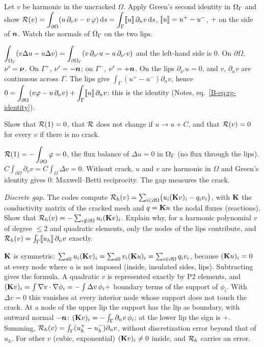 \q Let $v$ be harmonic in the uncracked $\Omega$. Apply Green's second
identity in $\Omega_\Gamma$ and show
$\displaystyle \mathcal{R}(v)=\int_{\partial\Omega}(u\,\partial_\nu v-v\,\varphi)\,\mathrm{d} s
=\int_\Gamma[\![u]\!]\,\partial_nv\,\mathrm{d} s$, $[\![u]\!]=u^+-u^-$, $+$ on the side
of $\bm{n}$. Watch the normals of $\Omega_\Gamma$ on the two lips.
\begin{answer}
$\displaystyle \int_{\Omega_\Gamma}(v\Delta u-u\Delta v)=\int_{\partial\Omega_\Gamma}(v\,\partial_{\nu'}u
-u\,\partial_{\nu'}v)$ and the left-hand side is $0$. On $\partial\Omega$,
$\nu'=\bm{\nu}$. On $\Gamma^+$, $\nu'=-\bm{n}$; on $\Gamma^-$, $\nu'=+\bm{n}$. On the
lips $\partial_{\nu'}u=0$, and $v$, $\partial_nv$ are continuous across
$\Gamma$. The lips give $\displaystyle \int_\Gamma(u^+-u^-)\partial_nv$, hence
$\displaystyle 0=\int_{\partial\Omega}(v\varphi-u\,\partial_\nu v)+\int_\Gamma[\![u]\!]\,\partial_nv$: this is the identity (Notes, eq.~\eqref{B-eq:rg-identity}).
\end{answer}

\q Show that $\mathcal{R}(1)=0$, that $\mathcal{R}$ does not change if $u\to u+C$, and that
$\mathcal{R}(v)=0$ for every $v$ if there is no crack.
\begin{answer}
$\displaystyle \mathcal{R}(1)=-\int_{\partial\Omega}\varphi=0$, the flux balance of
$\Delta u=0$ in $\Omega_\Gamma$ (no flux through the lips).
$\displaystyle C\int_{\partial\Omega}\partial_\nu v=C\int_\Omega\Delta v=0$.
Without crack, $u$ and $v$ are harmonic in $\Omega$ and Green's identity
gives $0$: Maxwell--Betti reciprocity. The gap measures the crack.
\end{answer}

\q \emph{Discrete gap.} The codes compute
$\mathcal{R}_h(v)=\sum_{i\in\partial\Omega}\bigl(u_i(\mathbf{K}v)_i-q_iv_i\bigr)$, with
$\mathbf{K}$ the conductivity matrix of the cracked mesh and $q=\mathbf{K}u$ the
nodal fluxes (reactions). Show that $\mathcal{R}_h(v)=-\sum_{i\notin\partial\Omega}
u_i(\mathbf{K}v)_i$. Explain why, for a harmonic polynomial $v$ of degree $\le2$
and quadratic elements, only the nodes of the lips contribute, and
$\mathcal{R}_h(v)=\int_\Gamma[\![u_h]\!]\,\partial_nv$ exactly.
\begin{answer}
$\mathbf{K}$ is symmetric:
$\sum_{\rm all}u_i(\mathbf{K}v)_i=\sum_{\rm all}v_i(\mathbf{K}u)_i=\sum_{i\in
\partial\Omega}q_iv_i$, because $(\mathbf{K}u)_i=0$ at every node where $u$ is not
imposed (inside, insulated sides, lips). Subtracting gives the formula.
A quadratic $v$ is represented exactly by P2 elements, and
$(\mathbf{K}v)_i=\int\nabla v\cdot\nabla\phi_i=-\int\Delta v\,\phi_i+$ boundary
terms of the support of $\phi_i$. With $\Delta v=0$ this vanishes at every
interior node whose support does not touch the crack. At a node of the upper
lip the support has the lip as boundary, with outward normal $-\bm{n}$:
$(\mathbf{K}v)_i=-\int_{\Gamma}\partial_nv\,\phi_i$; at the lower lip the sign is
$+$. Summing,
$\mathcal{R}_h(v)=\int_\Gamma(u_h^+-u_h^-)\partial_nv$, without discretization error
beyond that of $u_h$. For other $v$ (cubic, exponential) $(\mathbf{K}v)_i\ne0$
inside, and $\mathcal{R}_h$ carries an error.
\end{answer}


